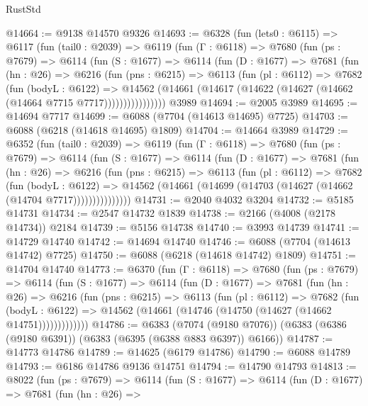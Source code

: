 \begin{lexlean}{RustStd}
\begin{coremodule}
@14664 := @9138 @14570 @9326
@14693 := @6328
    (fun (lets0 : @6115) =>
    @6117
      (fun (tail0 : @2039) =>
      @6119
        (fun (Γ : @6118) =>
        @7680
          (fun (ps : @7679) =>
          @6114
            (fun (S : @1677) =>
            @6114
              (fun (D : @1677) =>
              @7681
                (fun (hn : @26) =>
                @6216
                  (fun (pns : @6215) =>
                  @6113
                    (fun (pl : @6112) =>
                    @7682
                      (fun (bodyL : @6122) =>
                      @14562
                        (@14661 (@14617 (@14622 (@14627 (@14662 (@14664 @7715 @7717))))))))))))))))
    @3989
@14694 := @2005 @3989
@14695 := @14694 @7717
@14699 := @6088 (@7704 (@14613 @14695) @7725)
@14703 := @6088 (@6218 (@14618 @14695) @1809)
@14704 := @14664 @3989
@14729 := @6352
    (fun (tail0 : @2039) =>
    @6119
      (fun (Γ : @6118) =>
      @7680
        (fun (ps : @7679) =>
        @6114
          (fun (S : @1677) =>
          @6114
            (fun (D : @1677) =>
            @7681
              (fun (hn : @26) =>
              @6216
                (fun (pns : @6215) =>
                @6113
                  (fun (pl : @6112) =>
                  @7682
                    (fun (bodyL : @6122) =>
                    @14562 (@14661 (@14699 (@14703 (@14627 (@14662 (@14704 @7717)))))))))))))))
@14731 := @2040 @4032 @3204
@14732 := @5185 @14731
@14734 := @2547 @14732 @1839
@14738 := @2166 (@4008 (@2178 @14734)) @2184
@14739 := @5156 @14738
@14740 := @3993 @14739
@14741 := @14729 @14740
@14742 := @14694 @14740
@14746 := @6088 (@7704 (@14613 @14742) @7725)
@14750 := @6088 (@6218 (@14618 @14742) @1809)
@14751 := @14704 @14740
@14773 := @6370
    (fun (Γ : @6118) =>
    @7680
      (fun (ps : @7679) =>
      @6114
        (fun (S : @1677) =>
        @6114
          (fun (D : @1677) =>
          @7681
            (fun (hn : @26) =>
            @6216
              (fun (pns : @6215) =>
              @6113
                (fun (pl : @6112) =>
                @7682
                  (fun (bodyL : @6122) =>
                  @14562 (@14661 (@14746 (@14750 (@14627 (@14662 @14751)))))))))))))
@14786 := @6383
    (@7074 (@9180 @7076))
    (@6383 (@6386 (@9180 @6391)) (@6383 (@6395 (@6388 @883 @6397)) @6166))
@14787 := @14773 @14786
@14789 := @14625 (@6179 @14786)
@14790 := @6088 @14789
@14793 := @6186 @14786 @9136 @14751
@14794 := @14790 @14793
@14813 := @8022
    (fun (ps : @7679) =>
    @6114
      (fun (S : @1677) =>
      @6114
        (fun (D : @1677) =>
        @7681
          (fun (hn : @26) =>

\end{coremodule}
\end{lexlean}
